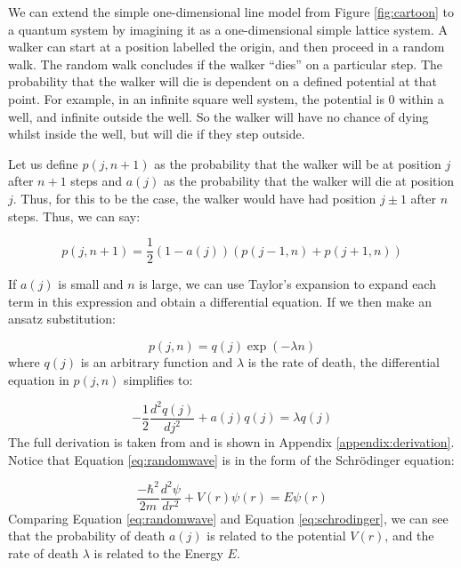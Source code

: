 \documentclass[journal]{IEEEtran}
\begin{document}
We can extend the simple one-dimensional line model from Figure
\ref{fig:cartoon} to a quantum system by imagining it as a one-dimensional
simple lattice system. A walker can start at a position labelled the origin, and
then proceed in a random walk. The random walk concludes if the walker ``dies''
on a particular step. The probability that the walker will die is dependent on a
defined potential at that point. For example, in an infinite square well system,
the potential is 0 within a well, and infinite outside the well. So the walker
will have no chance of dying whilst inside the well, but will die if they step
outside.

Let us define $p(j,n+1)$ as the probability that the walker will be at position
$j$ after $n+1$ steps and $a(j)$ as the probability that the walker will die at
position $j$. Thus, for this to be the case, the walker would have had position
$j\pm1$ after $n$ steps. Thus, we can say:

\begin{equation}
  p(j, n+1) =  \frac{1}{2}(1-a(j))(p(j-1,n) + p(j+1,n))
  \nonumber
\end{equation}

If $a(j)$ is small and $n$ is large, we can use Taylor's expansion to expand
each term in this expression and obtain a differential equation. If we then
make an ansatz substitution:

\begin{equation}
  p(j,n) = q(j) \exp(-\lambda n)
  \label{eq:firsteq}
\end{equation}
where $q(j)$ is an arbitrary function and $\lambda$ is the rate of death, the
differential equation in $p(j,n)$ simplifies to:

\begin{equation}
  -\frac{1}{2} \frac{d^2q(j)}{dj^2} + a(j)q(j) = \lambda q(j)
  \label{eq:randomwave}
\end{equation}
The full derivation is taken from \cite{MarcusNewton2020} and is shown in
Appendix \ref{appendix:derivation}. Notice that Equation \ref{eq:randomwave} is
in the form of the Schr\"{o}dinger equation:

\begin{equation}
  \label{eq:schrodinger}
  \frac{-\hbar^2}{2m}\frac{d^2 \psi}{dr^2} + V(r)\psi(r) = E\psi(r)
\end{equation}
Comparing Equation \ref{eq:randomwave} and Equation \ref{eq:schrodinger}, we can
see that the probability of death $a(j)$ is related to the potential $V(r)$,
and the rate of death $\lambda$ is related to the Energy $E$.
\end{document}
